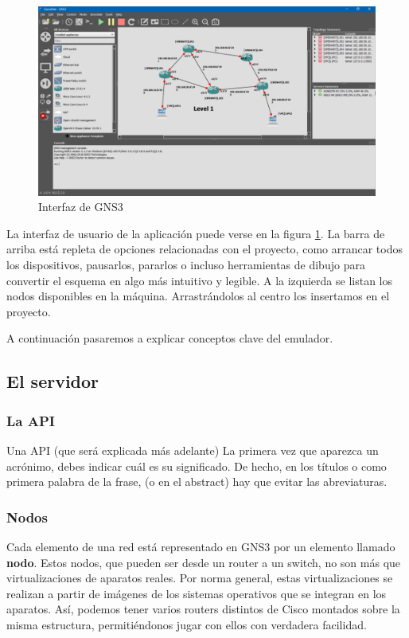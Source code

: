 \begin{figure}[h]
  \centering
  \includegraphics[scale=0.15]{imagenes/interfazgns}
  \caption{Interfaz de GNS3}
  \label{fig:interfazgns}
\end{figure}

La interfaz de usuario de la aplicación puede verse en la figura \ref{fig:interfazgns}. La barra de arriba está repleta de opciones relacionadas con el proyecto, como arrancar todos los dispositivos, pausarlos, pararlos o incluso herramientas de dibujo para convertir el esquema en algo más intuitivo y legible. A la izquierda se listan los nodos disponibles en la máquina. Arrastrándolos al centro los insertamos en el proyecto.

A continuación pasaremos a explicar conceptos clave del emulador.

\subsection{El servidor}

\subsubsection{La API}
Una API (que será explicada más adelante)
La primera vez que aparezca un acrónimo, debes indicar cuál es su significado. De hecho, en los títulos o como primera palabra de la frase, (o en el abstract) hay que evitar las abreviaturas.

\subsubsection{Nodos}
Cada elemento de una red está representado en GNS3 por un elemento llamado \textbf{nodo}. Estos nodos, que pueden ser desde un router a un switch, no son más que virtualizaciones de aparatos reales. Por norma general, estas virtualizaciones se realizan a partir de imágenes de los sistemas operativos que se integran en los aparatos. Así, podemos tener varios routers distintos de Cisco montados sobre la misma estructura, permitiéndonos jugar con ellos con verdadera facilidad.

